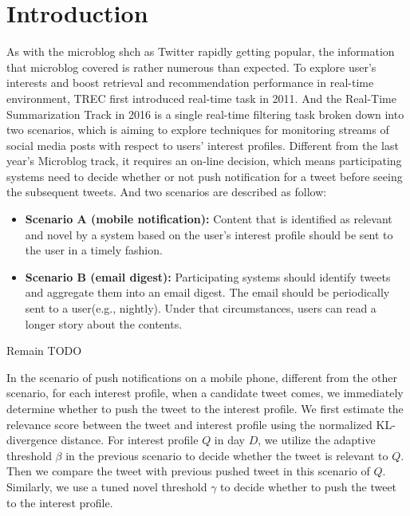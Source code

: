 \section{Introduction}
As with the microblog shch as Twitter rapidly getting popular, the information that microblog covered is rather numerous than expected. To explore user's interests and boost retrieval and recommendation performance in real-time environment, TREC first introduced real-time task in 2011\cite{ounis2011overview}. And the Real-Time Summarization Track in 2016 is a single real-time filtering task broken down into two scenarios, which is aiming to explore techniques for monitoring streams of social media posts with respect to users' interest profiles. Different from the last year's Microblog track, it requires an on-line decision, which means participating systems need to decide whether or not push notification for a tweet before seeing the subsequent tweets. And two scenarios are described as follow:

\begin{itemize}
\item \textbf{Scenario A (mobile notification):} Content that is identified as relevant and novel by a system based on the user's interest profile should be sent to the user in a timely fashion. 
\item \textbf{Scenario B (email digest):} Participating systems should identify tweets and aggregate them into an email digest. The email should be periodically sent to a user(e.g., nightly). Under that circumstances, users can read a longer story about the contents.
\end{itemize}


Remain TODO


In the scenario of push notifications on a mobile phone, different from the other scenario, for each interest profile, when a candidate tweet comes, we immediately determine whether to push the tweet to the interest profile. We first estimate the relevance score between the tweet and interest profile using the normalized KL-divergence distance. For interest profile $Q$ in day $D$, we utilize the adaptive threshold $\beta$ in the previous scenario to decide whether the tweet is relevant to $Q$. Then we compare the tweet with previous pushed tweet in this scenario of $Q$. Similarly, we use a tuned novel threshold $\gamma$ to decide whether to push the tweet to the interest profile.


